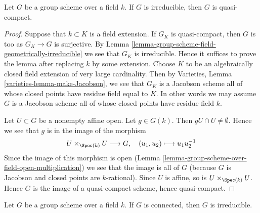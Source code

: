 \begin{lemma}
\label{lemma-irreducible-group-scheme-over-field-qc}
Let $G$ be a group scheme over a field $k$. If $G$ is irreducible,
then $G$ is quasi-compact.
\end{lemma}

\begin{proof}
Suppose that $k \subset K$ is a field extension. If $G_K$
is quasi-compact, then $G$ is too as $G_K \to G$ is surjective.
By Lemma \ref{lemma-group-scheme-field-geometrically-irreducible}
we see that $G_K$ is irreducible. Hence it suffices to prove the lemma
after replacing $k$ by some extension. Choose $K$ to be an algebraically
closed field extension of very large cardinality. Then by
Varieties, Lemma \ref{varieties-lemma-make-Jacobson},
we see that $G_K$ is a Jacobson scheme all of whose closed points have residue
field equal to $K$. In other words we may assume $G$ is a Jacobson
scheme all of whose closed points have residue field $k$.

\medskip\noindent
Let $U \subset G$ be a nonempty affine open. Let $g \in G(k)$. Then
$gU \cap U \not = \emptyset$. Hence we see that $g$ is in the image
of the morphism
$$
U \times_{\Spec(k)} U \longrightarrow G, \quad
(u_1, u_2) \longmapsto u_1u_2^{-1}
$$
Since the image of this morphism is open
(Lemma \ref{lemma-group-scheme-over-field-open-multiplication})
we see that the image is all of $G$ (because $G$ is Jacobson
and closed points are $k$-rational).
Since $U$ is affine, so is $U \times_{\Spec(k)} U$. Hence $G$ is the
image of a quasi-compact scheme, hence quasi-compact.
\end{proof}

\begin{lemma}
\label{lemma-connected-group-scheme-over-field-irreducible}
Let $G$ be a group scheme over a field $k$. If $G$ is connected,
then $G$ is irreducible.
\end{lemma}

